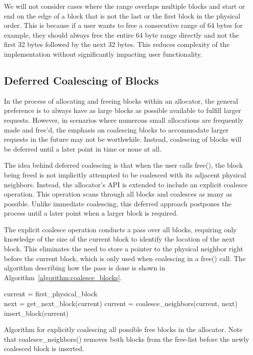 We will not consider cases where the range overlaps multiple blocks and start or end on the edge of a block that is not the last or the first block in the physical order. This is because if a user wants to free a consecutive range of 64 bytes for example, they should always free the entire 64 byte range directly and not the first 32 bytes followed by the next 32 bytes. This reduces complexity of the implementation without significantly impacting user functionality.

\subsection{Deferred Coalescing of Blocks}

In the process of allocating and freeing blocks within an allocator, the general preference is to always have as large blocks as possible available to fulfill larger requests. However, in scenarios where numerous small allocations are frequently made and free'd, the emphasis on coalescing blocks to accommodate larger requests in the future may not be worthwhile. Instead, coalescing of blocks will be deferred until a later point in time or none at all.

The idea behind deferred coalescing is that when the user calls free(), the block being freed is not implicitly attempted to be coalesced with its adjacent physical neighbors. Instead, the allocator's API is extended to include an explicit coalesce operation. This operation scans through all blocks and coalesces as many as possible. Unlike immediate coalescing, this deferred approach postpones the process until a later point when a larger block is required.

The explicit coalesce operation conducts a pass over all blocks, requiring only knowledge of the size of the current block to identify the location of the next block. This eliminates the need to store a pointer to the physical neighbor right before the current block, which is only used when coalescing in a free() call. The algorithm describing how the pass is done is shown in Algorithm~\ref{algorithm:coalesce_blocks}.

\begin{algorithm}[H]
current = first\_physical\_block\\
 {
next = get\_next\_block(current)\;
 {
    current = coalesce\_neighbors(current, next)\;
    insert\_block(current)\;
}
}
\label{algorithm:coalesce_blocks}
\caption{Algorithm for explicitly coalescing all possible free blocks in the allocator. Note that coalesce\_neighbors() removes both blocks from the free-list before the newly coalesced block is inserted.}
\end{algorithm}


